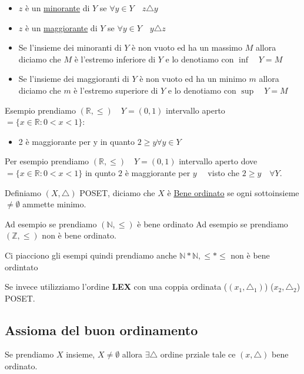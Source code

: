 \documentclass{article}
\theoremstyle{definition}
\begin{document}
\begin{itemize}
        \item $z$ è un \underline{minorante} di $Y$ se $\forall y \in Y \quad z \triangle y$
        \item $z$ è un \underline{maggiorante} di $Y$ se $\forall y \in Y \quad y \triangle z$

        \item Se l'insieme dei minoranti di $Y$ è non vuoto ed ha un massimo $M$ allora diciamo che $M$ è l'estremo inferiore di $Y$ e lo denotiamo con $\inf \quad  Y = M$
        \item Se l'insieme dei maggioranti di $Y$ è non vuoto ed ha un minimo $m$ allora diciamo che $m$ è l'estremo superiore di $Y$ e lo denotiamo con $\sup \quad  Y = M$
\end{itemize}

Esempio prendiamo $(\mathbb{R}, \le) \quad Y = (0,1)$ intervallo aperto $= \{x \in \mathbb{R} : 0 < x < 1\}$:
\begin{itemize}
        \item 2 è maggiorante per y in quanto $2 \ge y \forall y \in Y$
\end{itemize}

Per esempio prendiamo $(\mathbb{R}, \le) \quad Y = (0,1)$ intervallo aperto dove $ = \{x \in \mathbb{R} : 0 < x < 1\}$ in qunto $2$ è maggiorante per $y \quad $ visto che $2 \ge y \quad  \forall Y$.


Definiamo $(X, \triangle)$ POSET, diciamo che $X$ è \underline{Bene ordinato} se ogni sottoinsieme  $\not = \emptyset$ ammette minimo. \par
Ad esempio se prendiamo $(\mathbb{N}, \le)$ è bene ordinato
Ad esempio se prendiamo $(\mathbb{Z}, \le)$ non è bene ordinato. \par
Ci piacciono gli esempi quindi prendiamo anche $\mathbb{N}*\mathbb{N}, \le * \le  $ non è bene ordintato \par
Se invece utilizziamo l'ordine \textbf{LEX} con una coppia ordinata ($(x_1,\triangle_1)$) ($x_2,\triangle_2$) POSET.\newline



\subsection{Assioma del buon ordinamento}\label{Assioma_del_buon_ordinamento}
Se prendiamo $X$ insieme, $X \not = \emptyset$ allora $\exists \triangle$ ordine prziale tale ce $(x,\triangle)$ bene ordinato. \par
\end{document}
